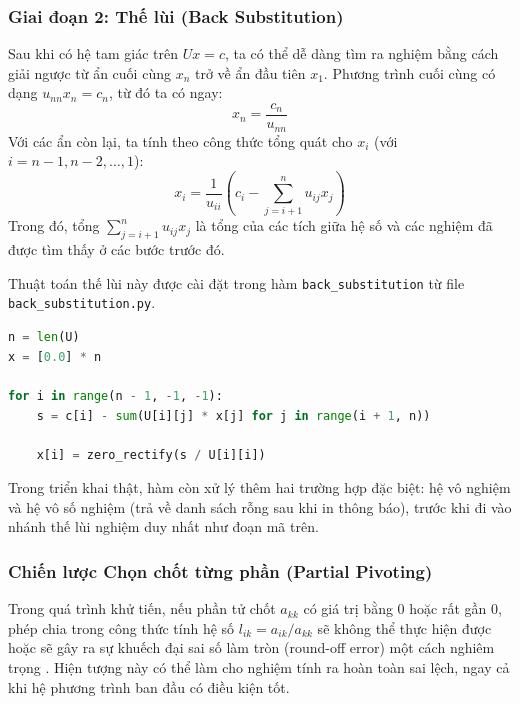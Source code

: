 \subsubsection{Giai đoạn 2: Thế lùi (Back Substitution)}
Sau khi có hệ tam giác trên $Ux=c$, ta có thể dễ dàng tìm ra nghiệm bằng cách giải ngược từ ẩn cuối cùng $x_n$ trở về ẩn đầu tiên $x_1$. 
Phương trình cuối cùng có dạng $u_{nn}x_n = c_n$, từ đó ta có ngay:
\begin{equation}
    x_n = \frac{c_n}{u_{nn}}
\end{equation}
Với các ẩn còn lại, ta tính theo công thức tổng quát cho $x_i$ (với $i = n-1, n-2, \dots, 1$):
\begin{equation}
    x_i = \frac{1}{u_{ii}} \left( c_i - \sum_{j=i+1}^{n} u_{ij} x_j \right)
\end{equation}
Trong đó, tổng $\sum_{j=i+1}^{n} u_{ij} x_j$ là tổng của các tích giữa hệ số và các nghiệm đã được tìm thấy ở các bước trước đó.

Thuật toán thế lùi này được cài đặt trong hàm \texttt{back\_substitution} từ file \texttt{back\_substitution.py}.

\begin{lstlisting}[language=Python, caption={Trích đoạn logic thế lùi từ \texttt{back\_substitution.py}}]
n = len(U)
x = [0.0] * n 

for i in range(n - 1, -1, -1):
    s = c[i] - sum(U[i][j] * x[j] for j in range(i + 1, n))
    
    x[i] = zero_rectify(s / U[i][i])
\end{lstlisting}
Trong triển khai thật, hàm còn xử lý thêm hai trường hợp đặc biệt: hệ vô nghiệm và hệ vô số nghiệm (trả về danh sách rỗng sau khi in thông báo), trước khi đi vào nhánh thế lùi nghiệm duy nhất như đoạn mã trên.


\subsubsection{Chiến lược Chọn chốt từng phần (Partial Pivoting)}
\label{sec:partial_pivoting}

Trong quá trình khử tiến, nếu phần tử chốt $a_{kk}$ có giá trị bằng 0 hoặc rất gần 0, phép chia trong công thức tính hệ số $l_{ik} = a_{ik}/a_{kk}$ sẽ không thể thực hiện được hoặc sẽ gây ra sự khuếch đại sai số làm tròn (round-off error) một cách nghiêm trọng \cite{higham2002}. Hiện tượng này có thể làm cho nghiệm tính ra hoàn toàn sai lệch, ngay cả khi hệ phương trình ban đầu có điều kiện tốt.

